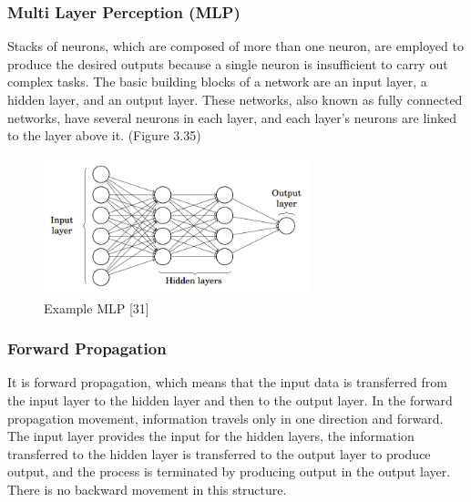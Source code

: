 \documentclass[12pt,twoside,a4]{mwbk}
\begin{document}
\subsubsection{Multi Layer Perception (MLP)}
Stacks of neurons, which are composed of more than one neuron, are employed to produce the desired outputs because a single neuron is insufficient to carry out complex tasks. The basic building blocks of a network are an input layer, a hidden layer, and an output layer. These networks, also known as fully connected networks, have several neurons in each layer, and each layer's neurons are linked to the layer above it. (Figure 3.35)
\begin{figure}[h]
    \centering
    \includegraphics[width=7.7cm, height=4.0cm]{multilayer-perceptron.png}
    \caption{Example MLP [31]}
\end{figure}

\subsubsection{Forward Propagation}
It is forward propagation, which means that the input data is transferred from the input layer to the hidden layer and then to the output layer. In the forward propagation movement, information travels only in one direction and forward. The input layer provides the input for the hidden layers, the information transferred to the hidden layer is transferred to the output layer to produce output, and the process is terminated by producing output in the output layer. There is no backward movement in this structure.
\end{document}
